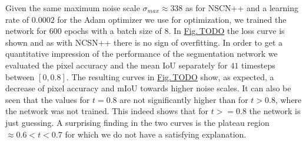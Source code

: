 %
Given the same maximum noise scale $\sigma_{max}\approx338$ as for NSCN++ and a learning rate of $0.0002$ for the Adam optimizer \cite{adam} we use for optimization, we trained the network for $600$ epochs with a batch size of $8$. In \hyperref[fig:]{Fig.\,TODO} the loss curve is shown and as with NCSN++ there is no sign of overfitting. In order to get a quantitative impression of the performance of the segmentation network we evaluated the pixel accuracy and the mean IoU separately for $41$ timesteps between $[0 ,0.8]$. The resulting curves in \hyperref[fig:]{Fig.\,TODO} show, as expected, a decrease of pixel accuracy and mIoU towards higher noise scales. It can also be seen that the values for $t=0.8$ are not significantly higher than for $t>0.8$, where the network was not trained. This indeed shows that for $t>=0.8$ the network is just guessing. A surprising finding in the two curves is the plateau region $\approx0.6<t<0.7$ for which we do not have a satisfying explanation.
%
